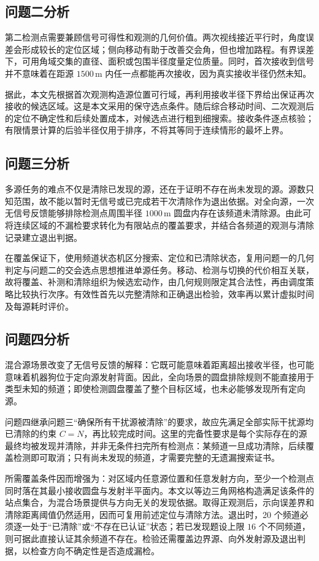 \subsection{问题二分析}
第二检测点需要兼顾信号可得性和观测的几何价值。两次视线接近平行时，角度误差会形成较长的定位区域；侧向移动有助于改善交会角，但也增加路程\cite{hammel1989,vanderhook2012cautious}。有界误差下，可用角域交集的直径、面积或包围半径度量定位质量\cite{tokekar2013asensor}。同时，首次接收到信号并不意味着在距源 $1500\,\mathrm{m}$ 内任一点都能再次接收，因为真实接收半径仍然未知。

据此，本文先根据首次观测构造源位置可行域，再利用接收半径下界给出保证再次接收的候选区域。这是本文采用的保守选点条件。随后综合移动时间、二次观测后的定位不确定性和后续处置成本，对候选点进行粗到细搜索。接收条件逐点核验；有限情景计算的后验半径仅用于排序，不将其等同于连续情形的最坏上界。

\subsection{问题三分析}
多源任务的难点不仅是清除已发现的源，还在于证明不存在尚未发现的源。源数只知范围，故不能以暂时无信号或已完成若干次清除作为退出依据。对全向源，一次无信号反馈能够排除检测点周围半径 $1000\,\mathrm{m}$ 圆盘内存在该频道未清除源。由此可将连续区域的不漏检要求转化为有限站点的覆盖要求\cite{cortes2004}，并结合各频道的观测与清除记录建立退出判据。

在覆盖保证下，使用频道状态机区分搜索、定位和已清除状态，复用问题一的几何判定与问题二的交会选点思想推进单源任务。移动、检测与切换的代价相互关联，故将覆盖、补测和清除组织为候选宏动作，由几何规则限定其合法性，再由调度策略比较执行次序。有效性首先以完整清除和正确退出检验，效率再以累计虚拟时间及每源耗时评价。

\subsection{问题四分析}
混合源场景改变了无信号反馈的解释：它既可能意味着距离超出接收半径，也可能意味着机器狗位于定向源发射背面。因此，全向场景的圆盘排除规则不能直接用于类型未知的频道；即使检测圆盘覆盖了整个目标区域，也未必能够发现所有定向源。

问题四继承问题三“确保所有干扰源被清除”的要求，故应先满足全部实际干扰源均已清除的约束 $C=N$，再比较完成时间。这里的完备性要求是每个实际存在的源最终均被发现并清除，并非无条件扫完所有检测点：某频道一旦成功清除，后续覆盖检测即可取消；只有尚未发现的频道，才需要完整的无遗漏搜索证书。

所需覆盖条件因而增强为：对区域内任意源位置和任意发射方向，至少一个检测点同时落在其最小接收圆盘与发射半平面内。本文以等边三角网格构造满足该条件的站点集合，为混合场景提供与方向无关的发现依据。取得正观测后，示向误差界和清除距离阈值仍然适用，因而可复用前述定位与清除方法。退出时，20 个频道必须逐一处于“已清除”或“不存在已认证”状态；若已发现题设上限 $16$ 个不同频道，则可据此直接认证其余频道不存在。检验还需覆盖边界源、向外发射源及退出判据，以检查方向不确定性是否造成漏检。

